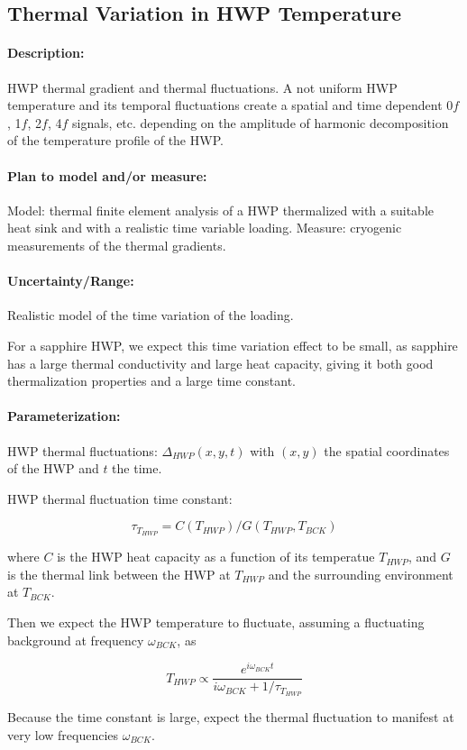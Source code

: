 \subsection{Thermal Variation in HWP Temperature}

\paragraph{Description:}
HWP thermal gradient and thermal fluctuations. A not uniform HWP temperature and its temporal fluctuations create a spatial and time dependent 0$f$, 1$f$, 2$f$, 4$f$ signals, etc. depending on the amplitude of harmonic decomposition of the temperature profile of the HWP. 

\paragraph{Plan to model and/or measure:}
Model: thermal finite element analysis of a HWP thermalized with a suitable heat sink and with a realistic time variable loading.
Measure: cryogenic measurements of the thermal gradients.


\paragraph{Uncertainty/Range:}
Realistic model of the time variation of the loading.

For a sapphire HWP, we expect this time variation effect to be small, as sapphire has a large thermal conductivity and large heat capacity, giving it both good thermalization properties and a large time constant.


\paragraph{Parameterization:}
HWP thermal fluctuations: $\Delta_{HWP}(x,y,t)$ with $(x,y)$ the spatial coordinates of the HWP and $t$ the time.

HWP thermal fluctuation time constant: 

\begin{equation}
\tau_{T_{HWP}} = C(T_{HWP})/G(T_{HWP}, T_{BCK})
\end{equation}

where $C$ is the HWP heat capacity as a function of its temperatue $T_{HWP}$, and $G$ is the thermal link between the HWP at $T_{HWP}$ and the surrounding environment at $T_{BCK}$. 

Then we expect the HWP temperature to fluctuate, assuming a fluctuating background at frequency $\omega_{BCK}$, as

 \begin{equation} 
 T_{HWP} \propto \frac{e^{i \omega_{BCK} t}}{i \omega_{BCK} + 1/\tau_{T_{HWP}}}
 \end{equation}
 
 Because the time constant is large, expect the thermal fluctuation to manifest at very low frequencies $\omega_{BCK}$.

